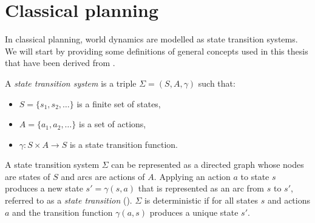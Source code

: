 \section{Classical planning}\label{subsec:Classical planning problem}
In classical planning, world dynamics are modelled as state transition systems. 
We will start by providing some definitions of general concepts used in this thesis that have been derived from \cite{ghallab2004automated}.


\begin{definition}
A \textit{state transition system} is a triple $\Sigma = (S, A, \gamma)$ such that:
\begin{itemize}
\item $S=\{s_1, s_2, \dots \}$ is a finite set of states,
\item $A=\{a_1, a_2, \dots \}$ is a set of actions,
\item $\gamma : S \times A \rightarrow S$ is a state transition function.
\end{itemize}
\end{definition}

A state transition system $\Sigma$ can be represented as a directed graph whose nodes are states of $S$ and arcs are actions of $A$. 
Applying an action $a$ to state $s$ produces a new state $s'= \gamma(s,a)$ that is represented as an arc from $s$ to $s'$, referred to as a  \textit{state transition} ().
$\Sigma$ is deterministic if for all states $s$ and actions $a$ and the transition function $\gamma(a, s)$ produces a unique state $s'$. 





